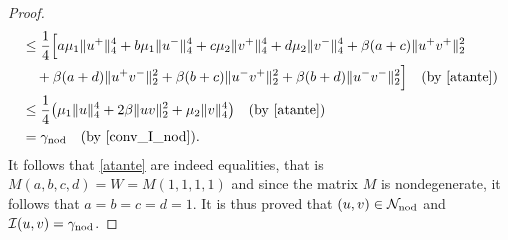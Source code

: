 \documentclass[reqno]{amsart}
\begin{document}
\begin{proof}
\begin{align*}
&\leq \frac{1}{4}  \Big[ a \mu_1 \|u^+\|_4^4  + b \mu_1 \|u^-\|_4^4
 + c \mu_2 \|v^+\|_4^4   + d \mu_2 \|v^-\|_4^4
 + \beta (a+c) \|u^+v^+\|_2^2  \\
&\quad + \beta (a+d) \|u^+v^-\|_2^2
 + \beta (b+c)\|u^-v^+\|_2^2  + \beta (b+d) \|u^-v^-\|_2^2
  \Big] \quad  \text{(by \eqref{atante})} \\
&\leq \frac{1}{4}  \big(\mu_1  \|u\|_4^4 +  2\beta\|uv\|_2^2
 + \mu_2 \|v\|_4^4 \big) \quad  \text{(by \eqref{atante})} \\
&= \gamma_{\rm nod}\quad \text{(by \eqref{conv_I_nod})} .
\end{align*}
It follows that \eqref{atante} are indeed equalities, that is
$M(a,b,c,d)=W= M(1,1,1,1)$
and since the matrix $M$ is nondegenerate, it follows that  $a=b=c=d=1$.
It is thus proved that $(u,v)\in \mathcal N_{\rm nod}$ and
$\mathcal I(u,v)=\gamma_{\rm nod}$.
\smallskip


\end{proof}
\end{document}
